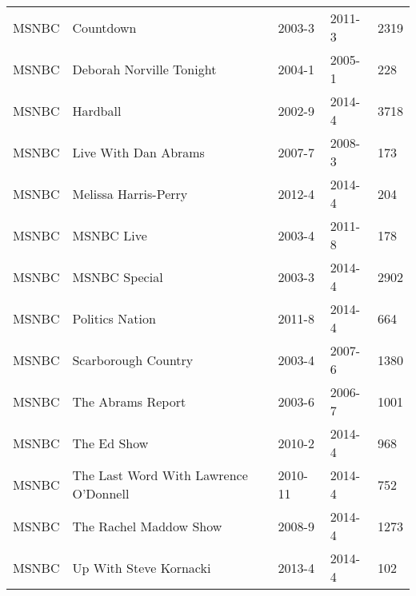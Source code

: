 \begin{longtable}{lllll}
  MSNBC & Countdown & 2003-3 & 2011-3 & 2319 \\ 
  MSNBC & Deborah Norville Tonight & 2004-1 & 2005-1 & 228 \\ 
  MSNBC & Hardball & 2002-9 & 2014-4 & 3718 \\ 
  MSNBC & Live With Dan Abrams & 2007-7 & 2008-3 & 173 \\ 
  MSNBC & Melissa Harris-Perry & 2012-4 & 2014-4 & 204 \\ 
  MSNBC & MSNBC Live & 2003-4 & 2011-8 & 178 \\ 
  MSNBC & MSNBC Special & 2003-3 & 2014-4 & 2902 \\ 
  MSNBC & Politics Nation & 2011-8 & 2014-4 & 664 \\ 
  MSNBC & Scarborough Country & 2003-4 & 2007-6 & 1380 \\ 
  MSNBC & The Abrams Report & 2003-6 & 2006-7 & 1001 \\ 
  MSNBC & The Ed Show & 2010-2 & 2014-4 & 968 \\ 
  MSNBC & The Last Word With Lawrence O'Donnell & 2010-11 & 2014-4 & 752 \\ 
  MSNBC & The Rachel Maddow Show & 2008-9 & 2014-4 & 1273 \\ 
  MSNBC & Up With Steve Kornacki & 2013-4 & 2014-4 & 102 \\ 
   \hline
\end{longtable}

